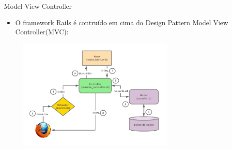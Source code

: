 \begin{frame}[t, fragile]{Model-View-Controller}
	\begin{itemize}
		\item O framework Rails é contruído em cima do Design Pattern Model View Controller(MVC):
	\end{itemize}
	\begin{figure}[h!]
		\centering
		\includegraphics[width=0.70\textwidth]{imagens/mvc.jpg}
	\end{figure}
\end{frame}
 

